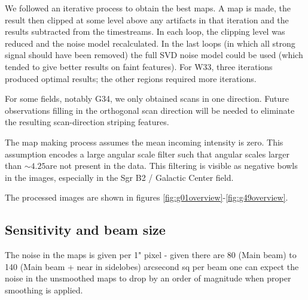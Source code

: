 \documentclass[twocolumn]{aastex62}
\def\todo#1{{\textcolor{red}{TODO: #1}}}
\begin{document}
We followed an iterative process to obtain the best maps.  A map is made, the
result then clipped at some level above any artifacts in that iteration and the
results subtracted from the timestreams.  In each loop, the clipping level was
reduced and the noise model recalculated.  In the last loops (in which all
strong signal should have been removed) the full SVD noise model could be used
(which tended to give better results on faint features). For W33, three
iterations produced optimal results; the other regions required more
iterations.

For some fields, notably G34, we only obtained scans in one direction.  Future
observations filling in the orthogonal scan direction will be needed to eliminate
the resulting scan-direction striping features.

The map making process assumes the mean incoming intensity is zero.  This assumption
encodes a large angular scale filter such that angular scales larger than $\sim4.25$\arcmin are not present in the data.  This filtering is visible as negative bowls in the images,
especially in the Sgr B2 / Galactic Center field.

The processed images are shown in figures
\ref{fig:g01overview}-\ref{fig:g49overview}.

\subsection{Sensitivity and beam size}

The noise in the maps is given per 1" pixel - given there are 80 (Main
beam) to 140 (Main beam + near in sidelobes) arcsecond sq per beam one can expect the noise in the unsmoothed maps to drop by an order of magnitude when proper smoothing is applied. 

\end{document}
